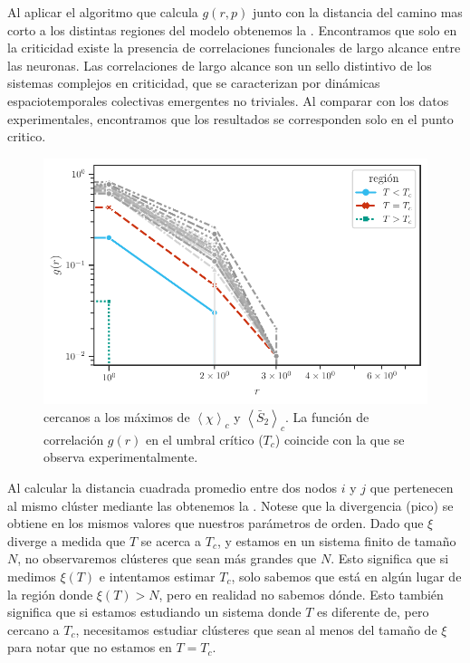   Al aplicar el algoritmo que calcula $g(r,p)$ junto con la distancia del camino mas corto a los distintas regiones del modelo  obtenemos la .   Encontramos que solo en la criticidad existe  la presencia de correlaciones funcionales de largo alcance entre las neuronas.   Las correlaciones  de largo alcance son un sello distintivo de los sistemas complejos en criticidad, que se caracterizan por dinámicas espaciotemporales colectivas emergentes no triviales.   Al comparar con los datos experimentales, encontramos que los resultados se corresponden solo en el punto critico.
  

\begin{figure}[h!]
	\centering\includegraphics[width=\imsize]{correlacion_experimento_gusano.pdf}
	\caption[Función de correlación $g(r)$: en función de $r$ para varios valores de $T$  de distintas regiones del diagrama de fase.  ]{cercanos  a los máximos de $\left\langle\chi\right\rangle_c$  y $\left\langle\bar{S}_2\right\rangle_c$. La función de correlación $g(r)$ en el umbral crítico ($T_c$) coincide con la que se observa experimentalmente.} \label{fig:correlacion_experimento_gusano}
\end{figure}

Al calcular la distancia cuadrada promedio entre dos nodos $i$ y $j$ que pertenecen al mismo clúster mediante las  obtenemos la . Notese que la divergencia (pico) se obtiene en los mismos valores que nuestros parámetros de orden.  Dado que $\xi$ diverge a medida que $T$  se acerca a $T_c$, y estamos en un sistema finito de tamaño $N$, no observaremos clústeres que sean más grandes que $N$. Esto significa que si medimos $\xi(T)$ e intentamos estimar $T_c$, solo sabemos que está en algún lugar de la región donde $\xi(T) > N$, pero en realidad no sabemos dónde. Esto también significa que si estamos estudiando un sistema donde $T$ es diferente de, pero cercano a $T_c$, necesitamos estudiar clústeres que sean al menos del tamaño de $\xi$ para notar que no estamos en $T = T_c$.

